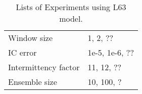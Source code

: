 \documentclass[draft]{ametsoc}
\begin{document}
\begin{table}[t]
\caption{Lists of Experiments using L63 model.}\label{tab:l63}
\begin{center}
\begin{tabular}{|l||l|}
\hline
Window size & 1, 2, ?? \\ 
IC error & 1e-5, 1e-6, ?? \\
Intermittency factor & 11, 12, ?? \\
Ensemble size & 10, 100, ? \\
\hline
\end{tabular}
\end{center}
\end{table}

%
\end{document}
